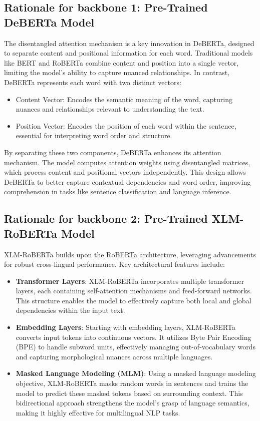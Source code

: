 \documentclass[9pt,a4paper,twoside]{rho-class/rho}
\begin{document}
    \subsection{\textbf{Rationale for backbone 1: Pre-Trained DeBERTa Model}}

        The disentangled attention mechanism is a key innovation in DeBERTa, designed to separate content and positional information for each word. Traditional models like BERT and RoBERTa combine content and position into a single vector, limiting the model’s ability to capture nuanced relationships. In contrast, DeBERTa represents each word with two distinct vectors:

\begin{itemize}
    \item Content Vector: Encodes the semantic meaning of the word, capturing nuances and relationships relevant to understanding the text.
    \item Position Vector: Encodes the position of each word within the sentence, essential for interpreting word order and structure.
\end{itemize}
By separating these two components, DeBERTa enhances its attention mechanism. The model computes attention weights using disentangled matrices, which process content and positional vectors independently. This design allows DeBERTa to better capture contextual dependencies and word order, improving comprehension in tasks like sentence classification and language inference.


    \subsection{\textbf{Rationale for backbone 2: Pre-Trained XLM-RoBERTa Model}}

        XLM-RoBERTa builds upon the RoBERTa architecture, leveraging advancements for robust cross-lingual performance. Key architectural features include:

\begin{itemize}
    \item \textbf{Transformer Layers}: XLM-RoBERTa incorporates multiple transformer layers, each containing self-attention mechanisms and feed-forward networks. This structure enables the model to effectively capture both local and global dependencies within the input text.
    \item \textbf{Embedding Layers}: Starting with embedding layers, XLM-RoBERTa converts input tokens into continuous vectors. It utilizes Byte Pair Encoding (BPE) to handle subword units, effectively managing out-of-vocabulary words and capturing morphological nuances across multiple languages.
    \item \textbf{Masked Language Modeling (MLM)}: Using a masked language modeling objective, XLM-RoBERTa masks random words in sentences and trains the model to predict these masked tokens based on surrounding context. This bidirectional approach strengthens the model's grasp of language semantics, making it highly effective for multilingual NLP tasks.
\end{itemize}
\end{document}

